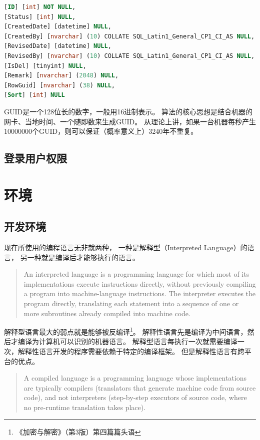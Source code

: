 \documentclass{book}
\begin{document}
\begin{lstlisting}[language=SQL]
[ID] [int] NOT NULL,
[Status] [int] NULL,
[CreatedDate] [datetime] NULL,
[CreatedBy] [nvarchar] (10) COLLATE SQL_Latin1_General_CP1_CI_AS NULL,
[RevisedDate] [datetime] NULL,
[RevisedBy] [nvarchar] (10) COLLATE SQL_Latin1_General_CP1_CI_AS NULL,
[IsDel] [tinyint] NULL,
[Remark] [nvarchar] (2048) NULL,
[RowGuid] [nvarchar] (38) NULL,
[Sort] [int] NULL
\end{lstlisting}

GUID是一个128位长的数字，一般用16进制表示。
算法的核心思想是结合机器的网卡、当地时间、一个随即数来生成GUID。
从理论上讲，如果一台机器每秒产生10000000个GUID，则可以保证（概率意义上）3240年不重复。

\subsection{登录用户权限}


\section{环境}

\subsection{开发环境}

现在所使用的编程语言无非就两种，
一种是解释型（Interpreted Language）的语言，
另一种就是编译后才能够执行的语言。

\begin{quotation}
An interpreted language is a programming language for 
which most of its implementations execute instructions directly, 
without previously compiling a program into machine-language instructions. 
The interpreter executes the program directly, 
translating each statement into a sequence of one or more subroutines already compiled into machine code.
\end{quotation}

解释型语言最大的弱点就是能够被反编译\footnote{《加密与解密》（第3版）第四篇篇头语}。
解释性语言先是编译为中间语言，然后才编译为计算机可以识别的机器语言。
解释型语言每执行一次就需要编译一次，解释性语言开发的程序需要依赖于特定的编译框架。
但是解释性语言有跨平台的优点。

\begin{quotation}
A compiled language is a programming language whose implementations 
are typically compilers (translators that generate machine code from source code), 
and not interpreters (step-by-step executors of source code, where no pre-runtime translation takes place).
\end{quotation}
\end{document}
